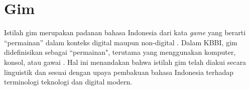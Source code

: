 

\section{Gim}\label{}
Istilah gim merupakan padanan bahasa Indonesia dari kata \textit{game} yang berarti “permainan” dalam konteks digital maupun non-digital \citep{danny2021valorant}. Dalam KBBI, gim didefinisikan sebagai “permainan", terutama yang menggunakan komputer, konsol, atau gawai \citep{KBBI2026}. Hal ini menandakan bahwa istilah gim telah diakui secara linguistik dan sesuai dengan upaya pembakuan bahasa Indonesia terhadap terminologi teknologi dan digital modern.

